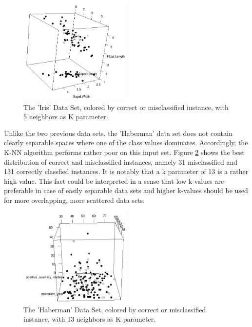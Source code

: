 \documentclass[paper=a4, fontsize=11pt]{scrartcl} %
\numberwithin{equation}{section} %
\numberwithin{figure}{section} %
\numberwithin{table}{section} %
\begin{document}
\begin{figure}[0.5\textwidth]
    \begin{center}
\includegraphics[width=0.5\textwidth]{Iris_correct_k5}
    \end{center}
\caption['Iris' correctness with k=5]{The 'Iris' Data Set, colored by correct or misclassified instance, with 5 neighbors as K parameter.}
\label{fig:iris:correct:k5}
\end{figure}

Unlike the two previous data sets, the 'Haberman' data set does not contain clearly separable spaces where one of the class values dominates. Accordingly, the K-NN algorithm performs rather poor on this input set. Figure \ref{fig:haberman:correct:k13} shows the best distribution of correct and misclassified instances, namely 31 misclassified and 131 correctly classfied instances. It is notably that a k parameter of 13 is a rather high value. This fact could be interpreted in a sense that low k-values are preferable in case of easily separable data sets and higher k-values should be used for more overlapping, more scattered data sets.
\begin{figure}[0.5\textwidth]
    \begin{center}
\includegraphics[width=0.5\textwidth]{Haberman_correct_k13}
    \end{center}
\caption['Haberman' correctness with k=13]{The 'Haberman' Data Set, colored by correct or misclassified instance, with 13 neighbors as K parameter.}
\label{fig:haberman:correct:k13}
\end{figure}
\end{document}
